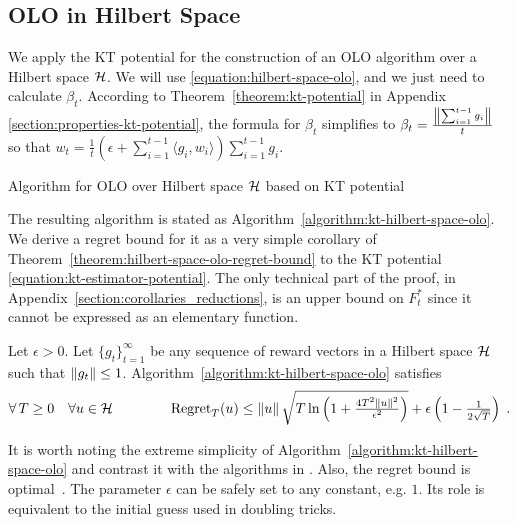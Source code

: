 \vspace{-0.1cm}

\subsection{OLO in Hilbert Space}
\label{section:kt-olo}

We apply the KT potential for the construction of an OLO algorithm over a
Hilbert space $\mathcal{H}$. We will use \eqref{equation:hilbert-space-olo}, and we just
need to calculate $\beta_t$. According to Theorem~\ref{theorem:kt-potential} in
Appendix \ref{section:properties-kt-potential}, the formula for $\beta_t$
simplifies to $\beta_t = \frac{\left\|{\sum_{i=1}^{t-1} g_i}\right\|}{t}$ so that $w_t =
\tfrac{1}{t} \left(\epsilon + \sum_{i=1}^{t-1} \langle g_i, w_i \rangle \right)
\sum_{i=1}^{t-1} g_i$.

\begin{algorithm}[t]
\caption{Algorithm for OLO over Hilbert space $\mathcal{H}$ based on KT potential
\label{algorithm:kt-hilbert-space-olo}}
\begin{algorithmic}[1]
{
\ENDFOR
}
\end{algorithmic}
\end{algorithm}

The resulting algorithm is stated as
Algorithm~\ref{algorithm:kt-hilbert-space-olo}.  We derive a regret bound for
it as a very simple corollary of
Theorem~\ref{theorem:hilbert-space-olo-regret-bound} to the KT potential
\eqref{equation:kt-estimator-potential}. The only technical part of the proof,
in Appendix~\ref{section:corollaries_reductions}, is an upper bound on $F_t^*$
since it cannot be expressed as an elementary function.
%
\begin{corollary}
\label{corollary:kt-hilbert-space-olo-regret} Let $\epsilon > 0$. Let
$\{g_t\}_{t=1}^\infty$ be any sequence of reward vectors in a Hilbert space
$\mathcal{H}$ such that $\left\|{g_t}\right\| \le 1$.
Algorithm~\ref{algorithm:kt-hilbert-space-olo} satisfies
\[
\forall \, T \ge 0 \quad
\forall u \in \mathcal{H} \qquad \qquad
\operatorname{Regret}_T(u) \le \left\|{u}\right\| \sqrt{T \ln\left(1 + \tfrac{4T^2 \left\|{u}\right\|^2}{\epsilon^2} \right)} + \epsilon \left(1 - \tfrac{1}{2\sqrt{T}} \right) \;.
\]
\end{corollary}
%
It is worth noting the extreme simplicity of
Algorithm~\ref{algorithm:kt-hilbert-space-olo} and contrast it with the
algorithms in \cite{Streeter-McMahan-2012, McMahan-Orabona-2014, Orabona-2013,
Orabona-2014}.  Also, the regret bound is
optimal~\cite{Streeter-McMahan-2012,Orabona-2013}.  The parameter $\epsilon$
can be safely set to any constant, e.g. $1$. Its role is equivalent to the
initial guess used in doubling tricks.

